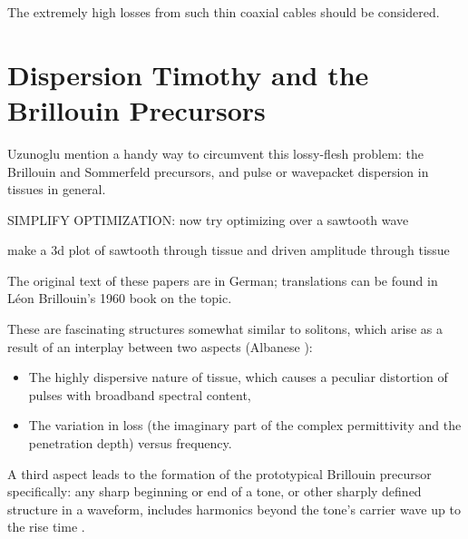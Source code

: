 \documentclass[paper.tex]{subfiles}
\begin{document}
The extremely high losses from such thin coaxial cables should be considered.


\pagebreak
\section{Dispersion Timothy and the Brillouin Precursors}

Uzunoglu \cite{Theoretical2020} mention a handy way to circumvent this lossy-flesh problem: the Brillouin and Sommerfeld precursors\footnotemark, and pulse or wavepacket dispersion in tissues in general.\footnotemark




SIMPLIFY OPTIMIZATION: now try optimizing over a sawtooth wave 

make a 3d plot of sawtooth through tissue and driven amplitude through tissue


The original text of these papers are in German; translations can be found in Léon Brillouin's 1960 
book\cite{Wave1960} on the topic. \footnotemark

These are fascinating structures somewhat similar to solitons, which arise as a result of an interplay between two aspects (Albanese 
\cite{Shortrisetime1989}): 

\begin{itemize}
	\item The highly dispersive nature of tissue, which causes a peculiar distortion of pulses with broadband spectral content,
	\item The variation in loss (the imaginary part of the complex permittivity and the penetration depth) versus frequency. 
\end{itemize}


A third aspect leads to the formation of the prototypical Brillouin precursor specifically: any sharp 
beginning or end of a tone, or other sharply defined structure in a waveform, includes harmonics beyond the tone's carrier wave up to the rise time \footnotemark. 
\end{document}
